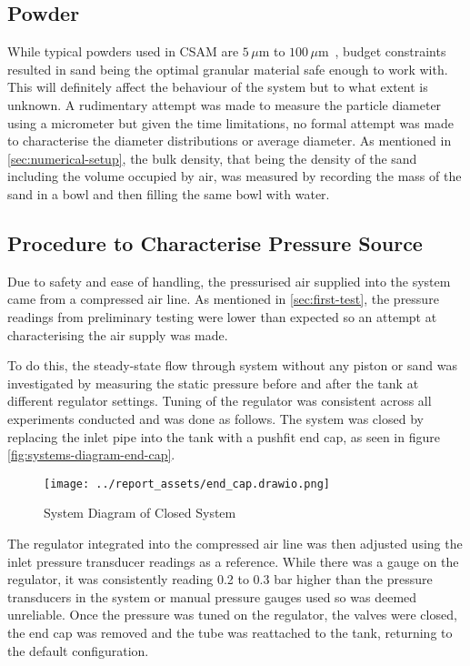 \subsection{Powder}
While typical powders used in CSAM are $5\,\mu\mathrm{m}$ to $100\,\mu\mathrm{m}$~\cite{Vaz2023}, budget constraints resulted in sand being the optimal granular material safe enough to work with. This will definitely affect the behaviour of the system but to what extent is unknown. A rudimentary attempt was made to measure the particle diameter using a micrometer but given the time limitations, no formal attempt was made to characterise the diameter distributions or average diameter. As mentioned in \autoref{sec:numerical-setup}, the bulk density, that being the density of the sand including the volume occupied by air, was measured by recording the mass of the sand in a bowl and then filling the same bowl with water.



\subsection{Procedure to Characterise Pressure Source}\label{sec:pressure-source-procedure}
Due to safety and ease of handling, the pressurised air supplied into the system came from a compressed air line. As mentioned in \autoref{sec:first-test}, the pressure readings from preliminary testing were lower than expected so an attempt at characterising the air supply was made. 

To do this, the steady-state flow through system without any piston or sand was investigated by measuring the static pressure before and after the tank at different regulator settings. Tuning of the regulator was consistent across all experiments conducted and was done as follows. The system was closed by replacing the inlet pipe into the tank with a pushfit end cap, as seen in figure \autoref{fig:systems-diagram-end-cap}.
\begin{figure}[htbp]
    \centering
    \begin{minipage}{0.60\textwidth}
        \centering
        \texttt{[image: ../report\_assets/end\_cap.drawio.png]}
        \caption{System Diagram of Closed System}\label{fig:systems-diagram-end-cap}
    \end{minipage}
\end{figure}
The regulator integrated into the compressed air line was then adjusted using the inlet pressure transducer readings as a reference. While there was a gauge on the regulator, it was consistently reading 0.2 to 0.3 bar higher than the pressure transducers in the system or manual pressure gauges used so was deemed unreliable. Once the pressure was tuned on the regulator, the valves were closed, the end cap was removed and the tube was reattached to the tank, returning to the default configuration. 

